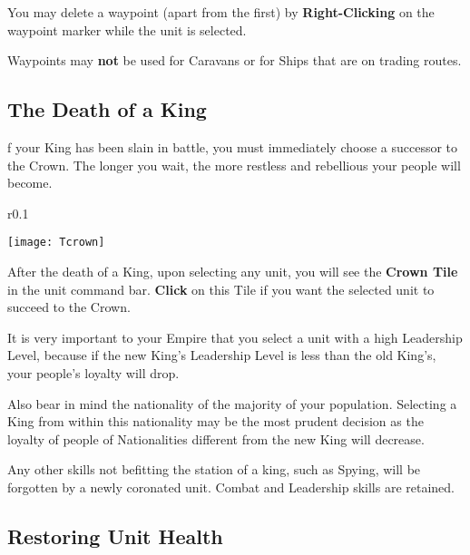You may delete a waypoint (apart from the first) by \textbf{Right-Clicking} on the waypoint marker while the unit is selected.

Waypoints may \textbf{not} be used for Caravans or for Ships that are on trading routes.

\subsection{\textsf{The Death of a King}}


f your King has been slain in battle, you must immediately choose a successor to the Crown. The longer you wait, the more restless and rebellious your people will become.

\begin{wrapfigure}{r}{0.1\textwidth}
    \vspace{-20pt}
    \begin{center}
        \texttt{[image: Tcrown]}
    \end{center}
    \vspace{-20pt}
\end{wrapfigure}

After the death of a King, upon selecting any unit, you will see the \textbf{Crown Tile} in the unit command bar. \textbf{Click} on this Tile if you want the selected unit to succeed to the Crown.

It is very important to your Empire that you select a unit with a high Leadership Level, because if the new King’s Leadership Level is less than the old King’s, your people’s loyalty will drop.

Also bear in mind the nationality of the majority of your population. Selecting a King from within this nationality may be the most prudent decision as the loyalty of people of Nationalities different from the new King will decrease.

Any other skills not befitting the station of a king, such as Spying, will be forgotten by a newly coronated unit. Combat and Leadership skills are retained.

\subsection{\textsf{Restoring Unit Health}}


